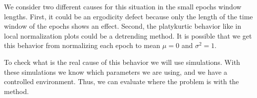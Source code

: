 We consider two different causes for this situation in the small epochs window
lengths. First, it could be an ergodicity defect because only the length of the
time window of the epochs shows an effect. Second, the platykurtic behavior
like in local normalization plots \cite{local_normalization} could be a
detrending method. It is possible that we get this behavior from normalizing
each epoch to mean $\mu = 0$ and $\sigma^{2}=1$.

To check what is the real cause of this behavior we will use simulations.
With these simulations we know which parameters we are using, and we have a
controlled environment. Thus, we can evaluate where the problem is with the
method.